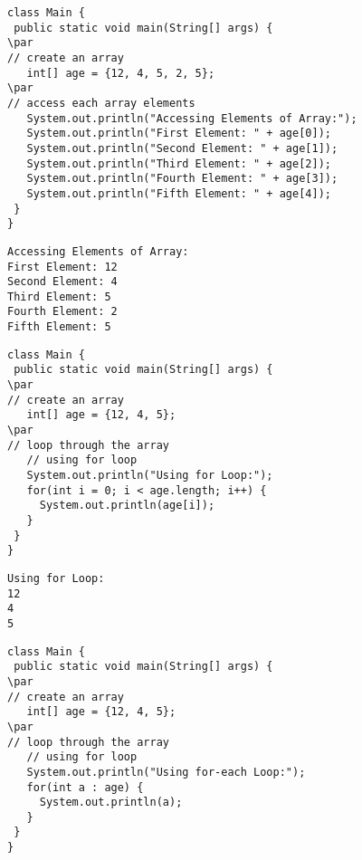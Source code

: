 \documentclass{book}
\def\lthtmlcheckvsize{\ifdim\ht\sizebox<\vsize 
  \ifdim\wd\sizebox<\hsize\expandafter\hfill\fi \expandafter\vfill
  \else\expandafter\vss\fi}%
\begin{document}
{\newpage\clearpage
{}%
\begin{lstlisting}
class Main {
 public static void main(String[] args) {
\par
// create an array
   int[] age = {12, 4, 5, 2, 5};
\par
// access each array elements
   System.out.println("Accessing Elements of Array:");
   System.out.println("First Element: " + age[0]);
   System.out.println("Second Element: " + age[1]);
   System.out.println("Third Element: " + age[2]);
   System.out.println("Fourth Element: " + age[3]);
   System.out.println("Fifth Element: " + age[4]);
 }
}
\end{lstlisting}%
\lthtmlfigureZ
\lthtmlcheckvsize\clearpage}

{\newpage\clearpage
{}%
\begin{lstlisting}
Accessing Elements of Array:
First Element: 12
Second Element: 4
Third Element: 5
Fourth Element: 2
Fifth Element: 5
\end{lstlisting}%
\lthtmlfigureZ
\lthtmlcheckvsize\clearpage}

{\newpage\clearpage
{}%
\begin{lstlisting}
class Main {
 public static void main(String[] args) {
\par
// create an array
   int[] age = {12, 4, 5};
\par
// loop through the array
   // using for loop
   System.out.println("Using for Loop:");
   for(int i = 0; i < age.length; i++) {
     System.out.println(age[i]);
   }
 }
}
\end{lstlisting}%
\lthtmlfigureZ
\lthtmlcheckvsize\clearpage}

{\newpage\clearpage
{}%
\begin{lstlisting}
Using for Loop:
12
4
5
\end{lstlisting}%
\lthtmlfigureZ
\lthtmlcheckvsize\clearpage}

{\newpage\clearpage
{}%
\begin{lstlisting}
class Main {
 public static void main(String[] args) {
\par
// create an array
   int[] age = {12, 4, 5};
\par
// loop through the array
   // using for loop
   System.out.println("Using for-each Loop:");
   for(int a : age) {
     System.out.println(a);
   }
 }
}
\end{lstlisting}%
\lthtmlfigureZ
\lthtmlcheckvsize\clearpage}
\end{document}
